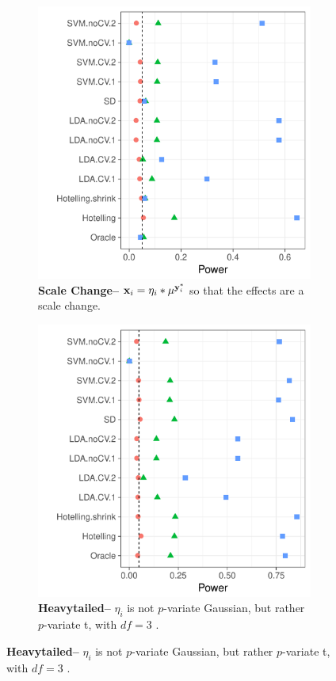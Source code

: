 \documentclass[12pt,a4paper]{article}
\begin{document}
\begin{figure}[h]
	\centering
	\caption{\mycaption}	
	\begin{subfigure}{.5\textwidth}
		\centering
		\includegraphics[width=1\linewidth]{"art/file8"}
		\caption{\textbf{Scale Change--} $\mathbf{x}_i =  \eta_i * \mu^ {\mathbf{y}^*_i}$ so that the effects are a scale change.}  
		\label{fig:scale_change}
	\end{subfigure}%
	\begin{subfigure}{.5\textwidth}
		\centering
		\includegraphics[width=1\linewidth]{"art/file9"}
		\caption{\textbf{Heavytailed--} $\eta_i$ is not $p$-variate Gaussian, but rather $p$-variate t, with $df=3$ .  } 
		\label{fig:t_null}
	\end{subfigure}
\end{figure}
\end{document}

